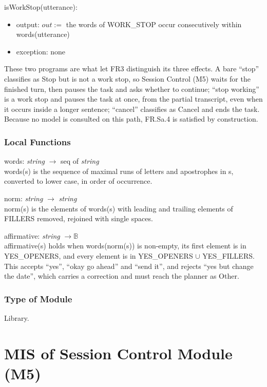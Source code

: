 \documentclass[12pt, titlepage]{article}
\newcommand{\str}{\textit{string}}
\newcommand{\B}{\mathbb{B}}
\begin{document}
\noindent isWorkStop(utterance):
\begin{itemize}
\item output: $out :=$ the words of WORK\_STOP occur consecutively within
words(utterance)
\item exception: none
\end{itemize}

\noindent These two programs are what let FR3 distinguish its three effects. A
bare ``stop'' classifies as Stop but is not a work stop, so Session Control (M5)
waits for the finished turn, then pauses the task and asks whether to continue;
``stop working'' is a work stop and pauses the task at once, from the partial
transcript, even when it occurs inside a longer sentence; ``cancel''
classifies as Cancel and ends the task. Because no model is consulted on this
path, FR.Sa.4 is satisfied by construction.

\subsubsection{Local Functions}

\noindent words: \str{} $\to$ seq of \str\\
words(s) is the sequence of maximal runs of letters and apostrophes in s,
converted to lower case, in order of occurrence.

\noindent norm: \str{} $\to$ \str\\
norm(s) is the elements of words(s) with leading and trailing elements of
FILLERS removed, rejoined with single spaces.

\noindent affirmative: \str{} $\to \B$\\
affirmative(s) holds when words(norm(s)) is non-empty, its first element is in
YES\_OPENERS, and every element is in YES\_OPENERS $\cup$ YES\_FILLERS. This
accepts ``yes'', ``okay go ahead'' and ``send it'', and rejects ``yes but change
the date'', which carries a correction and must reach the planner as Other.

\subsubsection{Type of Module}

Library.

\newpage

\section{MIS of Session Control Module (M5)} \label{mod:ctrl}
\end{document}
